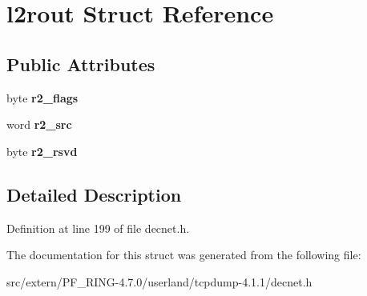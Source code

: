\hypertarget{structl2rout}{
\section{l2rout Struct Reference}
\label{structl2rout}
}
\subsection*{Public Attributes}
\begin{DoxyCompactItemize}
\item 
\hypertarget{structl2rout_a3fb0ff11bd1de79ab22a6d122ac3c2ab}{
byte {\bfseries r2\_\-flags}}
\label{structl2rout_a3fb0ff11bd1de79ab22a6d122ac3c2ab}

\item 
\hypertarget{structl2rout_a2e315c96551fbcb4789a3fe6ff474544}{
word {\bfseries r2\_\-src}}
\label{structl2rout_a2e315c96551fbcb4789a3fe6ff474544}

\item 
\hypertarget{structl2rout_a612d1eae5f9576333f2400a1f1083bcf}{
byte {\bfseries r2\_\-rsvd}}
\label{structl2rout_a612d1eae5f9576333f2400a1f1083bcf}

\end{DoxyCompactItemize}


\subsection{Detailed Description}


Definition at line 199 of file decnet.h.



The documentation for this struct was generated from the following file:\begin{DoxyCompactItemize}
\item 
src/extern/PF\_\-RING-\/4.7.0/userland/tcpdump-\/4.1.1/decnet.h\end{DoxyCompactItemize}
